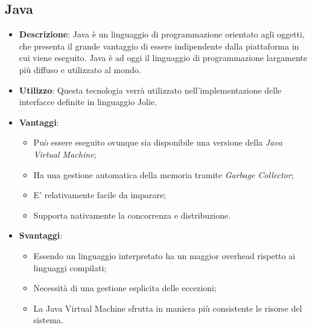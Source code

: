 \subsection{Java}
\begin{itemize}
	\item \textbf{Descrizione}: Java è un linguaggio di programmazione orientato agli oggetti, che presenta il grande vantaggio di essere indipendente dalla piattaforma in cui viene eseguito. Java è ad oggi il linguaggio di programmazione largamente più diffuso e utilizzato al mondo.
	\item \textbf{Utilizzo}: Questa tecnologia verrà utilizzato nell'implementazione delle interfacce definite in linguaggio Jolie.
	\item \textbf{Vantaggi}:
	\begin{itemize}
		\item Può essere eseguito ovunque sia disponibile una versione della \textit{Java Virtual Machine};
		\item Ha una gestione automatica della memoria tramite \textit{Garbage Collector};
		\item E' relativamente facile da imparare;
		\item Supporta nativamente la concorrenza e distribuzione.
	\end{itemize}
	\item \textbf{Svantaggi}:
	\begin{itemize}
		\item Essendo un linguaggio interpretato ha un maggior overhead rispetto ai linguaggi compilati;
		\item Necessità di una gestione esplicita delle eccezioni;
		\item La Java Virtual Machine sfrutta in maniera più consistente le risorse del sistema.
	\end{itemize}
\end{itemize}

